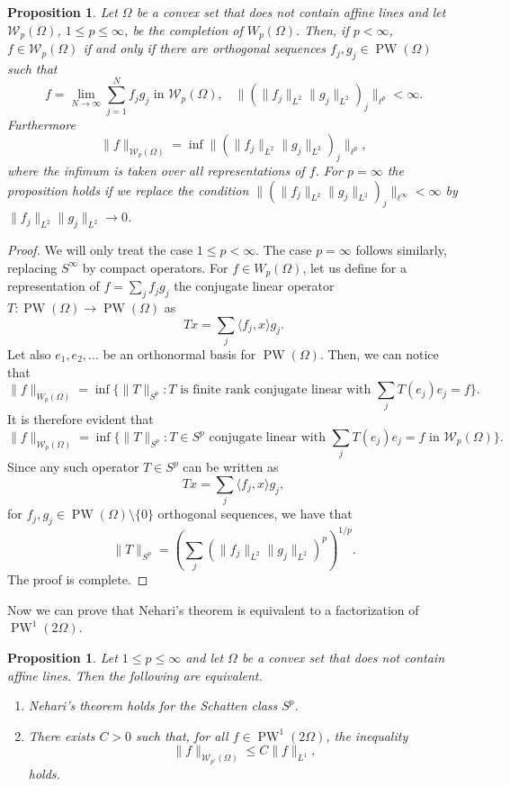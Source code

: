 \documentclass{amsart}
\theoremstyle{plain}
\newtheorem{prop}[theo]{Proposition}
\DeclareMathOperator{\PW}{PW}
\begin{document}
\begin{prop}\label{completion}
	Let $\Omega$ be a convex set that does not contain affine lines and let $\mathcal{W}_p(\Omega)$, $1\leq p\leq \infty$, be the completion of $W_p(\Omega)$. Then, if $p<\infty$, $f\in \mathcal{W}_p(\Omega)$ if and only if there are orthogonal sequences $f_j,g_j\in \PW(\Omega)$ such that
	$$f=\lim_{N\to \infty} \sum_{j=1}^N f_j g_j \text{ in $\mathcal{W}_p(\Omega)$,} \quad \| (\|f_j\|_{L^2}\|g_j\|_{L^2})_{j}\|_{\ell^p}<\infty.$$
	Furthermore
	$$\|f\|_{\mathcal{W}_p(\Omega)}=\inf \|(\|f_j\|_{L^2}\|g_j\|_{L^2})_j\|_{\ell^p},$$ where the infimum is taken over all representations of $f$.
	For $p=\infty$ the proposition holds if we replace the condition $\| (\|f_j\|_{L^2}\|g_j\|_{L^2})_{j}\|_{\ell^\infty}<\infty$ by $\|f_j\|_{L^2}\|g_j\|_{L^2}\to 0$.
\end{prop}
\begin{proof}
	We will only treat the case $1\leq p<\infty.$ The case $p=\infty$ follows similarly, replacing $S^\infty$ by compact operators. For $f\in W_p(\Omega)$, let us define for a representation of $f=\sum_j f_jg_j$ the conjugate linear operator $T:\PW(\Omega)\to \PW(\Omega)$ as
	$$Tx=\sum_j \langle f_j,x\rangle g_j.$$
Let also $e_1,e_2,...$ be an orthonormal basis for $\PW(\Omega)$. Then, we can notice that
	$$\|f\|_{W_p(\Omega)}=\inf\{\|T\|_{S^p}: T\text{ is finite rank conjugate linear with }\sum_j T(e_j)e_j=f\}.$$
	It is therefore evident that
	$$\|f\|_{\mathcal{W}_p(\Omega)}=\inf\{\|T\|_{S^p}: T\in S^p\text{ conjugate linear with }\sum_j T(e_j)e_j=f \text{ in }\mathcal{W}_p(\Omega)\}.$$
	Since any such operator $T\in S^p$ can be written as 
	$$Tx=\sum_j \langle f_j,x\rangle g_j,$$ for $f_j,g_j\in \PW(\Omega)\setminus\{0\}$ orthogonal sequences, we have that
	$$\|T\|_{S^p}=\left(\sum_j (\|f_j\|_{L^2}\|g_j\|_{L^2})^p\right)^{1/p}.$$
	The proof is complete.
\end{proof}
Now we can prove that Nehari's theorem is equivalent to a factorization of $\PW^1(2\Omega)$.
\begin{prop}\label{factor}
	Let $1\leq p\leq \infty$ and let $\Omega$ be a convex set that does not contain affine lines. Then the following are equivalent.
	\begin{enumerate}
		\item Nehari's theorem holds for the Schatten class $S^p$.
		\item There exists $C>0$ such that, for all $f\in \PW^1(2\Omega)$, the inequality
		$$\|f\|_{\mathcal{W}_{p'}(\Omega)}\leq C\|f\|_{L^1},$$ holds.
	\end{enumerate}
\end{prop}
\end{document}
